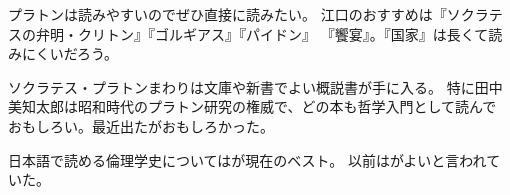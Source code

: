 \documentclass{jsarticle}
\begin{document}
プラトンは読みやすいのでぜひ直接に読みたい。
江口のおすすめは『ソクラテスの弁明・クリトン』『ゴルギアス』『パイドン』
『饗宴』。『国家』は長くて読みにくいだろう。



ソクラテス・プラトンまわりは文庫や新書でよい概説書が手に入る。
特に田中美知太郎は昭和時代のプラトン研究の権威で、どの本も哲学入門として読んで
おもしろい。最近出た\cite{納富信留06:ソフィスト}がおもしろかった。

日本語で読める倫理学史については\citet{norman98:_moral_philos}が現在のベスト。
以前は\citet{macintyre67:_short_histor_of_ethic}がよいと言われていた。


\nocite{田中美知太郎57:ソクラテス}
\nocite{田中美知太郎76:ソフィスト}
\end{document}
